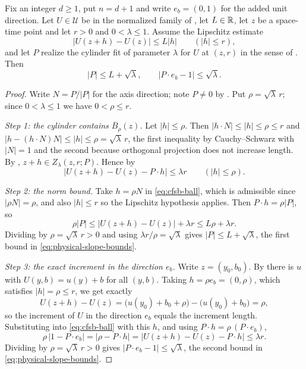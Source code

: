 \begin{lemma}
Fix an integer $d\ge1$, put $n=d+1$ and write $e_b=(0,1)$ for the added unit
direction. Let $U\in\mathcal U$ be in the normalized family of
, let $L\in\mathbb{R}$, let $z$ be a space-time point and
let $r>0$ and $0<\lambda\le1$. Assume the Lipschitz estimate
\[
  |U(z+h)-U(z)|\le L|h|\qquad(|h|\le r),
\]
and let $P$ realize the cylinder fit of parameter $\lambda$ for $U$ at $(z,r)$
in the sense of . Then
\begin{equation}\label{eq:physical-slope-bounds}
  |P|\le L+\sqrt\lambda,\qquad
  |P\cdot e_b-1|\le\sqrt\lambda .
\end{equation}
\end{lemma}
\begin{proof}
Write $N=P/|P|$ for the axis direction; note $P\ne0$ by
. Put $\rho=\sqrt\lambda\,r$; since $0<\lambda\le1$ we
have $0<\rho\le r$.

\emph{Step 1: the cylinder contains $\overline B_\rho(z)$.}
Let $|h|\le\rho$. Then $|h\cdot N|\le|h|\le\rho\le r$ and
$|h-(h\cdot N)N|\le|h|\le\rho=\sqrt\lambda\,r$, the first inequality by
Cauchy--Schwarz with $|N|=1$ and the second because orthogonal projection does
not increase length. By , $z+h\in Z_\lambda(z,r;P)$. Hence
by 
\begin{equation}\label{eq:cfsb-ball}
  |U(z+h)-U(z)-P\cdot h|\le\lambda r\qquad(|h|\le\rho).
\end{equation}

\emph{Step 2: the norm bound.}
Take $h=\rho N$ in \eqref{eq:cfsb-ball}, which is admissible since
$|\rho N|=\rho$, and also $|h|\le r$ so the Lipschitz hypothesis applies. Then
$P\cdot h=\rho|P|$, so
\[
  \rho|P|\le|U(z+h)-U(z)|+\lambda r\le L\rho+\lambda r .
\]
Dividing by $\rho=\sqrt\lambda\,r>0$ and using $\lambda r/\rho=\sqrt\lambda$
gives $|P|\le L+\sqrt\lambda$, the first bound in
\eqref{eq:physical-slope-bounds}.

\emph{Step 3: the exact increment in the direction $e_b$.}
Write $z=(y_0,b_0)$. By  there is $u$ with
$U(y,b)=u(y)+b$ for all $(y,b)$. Taking $h=\rho e_b=(0,\rho)$, which satisfies
$|h|=\rho\le r$, we get exactly
\[
  U(z+h)-U(z)=\bigl(u(y_0)+b_0+\rho\bigr)-\bigl(u(y_0)+b_0\bigr)=\rho,
\]
so the increment of $U$ in the direction $e_b$ equals the increment length.
Substituting into \eqref{eq:cfsb-ball} with this $h$, and using
$P\cdot h=\rho\,(P\cdot e_b)$,
\[
  \rho\,|1-P\cdot e_b|=|\rho-P\cdot h|
     =|U(z+h)-U(z)-P\cdot h|\le\lambda r .
\]
Dividing by $\rho=\sqrt\lambda\,r>0$ gives $|P\cdot e_b-1|\le\sqrt\lambda$, the
second bound in \eqref{eq:physical-slope-bounds}.
\end{proof}
